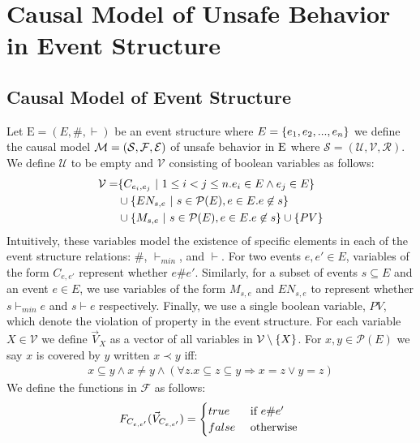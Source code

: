 \section{Causal Model of Unsafe Behavior in Event Structure}

\subsection{Causal Model of Event Structure}
Let $\mathrm{E} = (E,\#,\vdash)$ be an event structure where
$E = \{e_1, e_2, ...,e_n\}$ we define the causal model
$\mathcal{M} = (\mathcal{S},\mathcal{F},\mathcal{E})$ of unsafe behavior
in $\mathrm{E}$ where
$\mathcal{S} = (\mathcal{U},\mathcal{V},\mathcal{R})$.
We define $\mathcal{U}$ to be empty and $\mathcal{V}$
consisting of boolean variables as follows:
\begin{align*}
    \mathcal{V} = & \{C_{e_i,e_j} ~|~  1 \leq i < j \leq n.
    e_i \in E \wedge e_j \in E\}                                \\
                  & \cup \{EN_{s,e} ~|~ s \in \mathcal{P}(E),
    e \in E. e \not \in s \}                                  \\
                  & \cup \{M_{s,e} ~|~ s \in \mathcal{P}(E),
        e \in E. e \not \in s \} \cup \{PV\}
\end{align*}
Intuitively, these variables model the existence of specific elements in 
each of the event structure relations: $\#$, $\vdash_{min}$, and $\vdash$.
For two events $e,e' \in E$, variables of the form $C_{e,e'}$ represent whether $e\#e'$.
Similarly, for a subset of events $s \subseteq E$ and an event $e \in E$,
we use variables of the form $M_{s,e}$ and $EN_{s,e}$ to represent 
whether $s \vdash_{min} e$ and $s \vdash e$ respectively.
Finally, we use a single boolean variable, $PV$, which denote the 
violation of property in the event structure.
For each variable $X \in \mathcal{V}$ we define $\vec V_X$ 
as a vector of all variables in $\mathcal{V} \setminus \{X\}$.
For $x,y \in \mathcal{P}(E)$ we say $x$ is covered by $y$ written $ x \prec y$ iff:
\begin{align*}
    x \subseteq y \wedge x \neq y \wedge
    (\forall z. x \subseteq z \subseteq y \Rightarrow x = z
    \vee y = z)
\end{align*}
We define the functions in $\mathcal{F}$ as follows:
$$
    F_{C_{e,e'}}(\vec V_{C_{e,e'}}) = \begin{cases}
        true  & \text{ if } e \# e' \\
        false & \text{ otherwise }
    \end{cases}
$$

